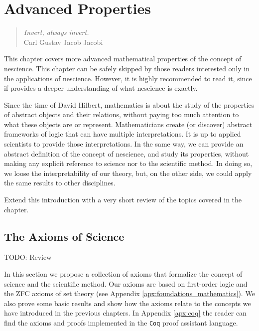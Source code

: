 %
%


\chapter{Advanced Properties}
\label{chap:Properties-Nescience}

\begin{quote}
\begin{flushright}
\emph{Invert, always invert.}\\
Carl Gustav Jacob Jacobi\\
\end{flushright}
\end{quote}
\bigskip

This chapter covers more advanced mathematical properties of the concept of nescience. This chapter can be safely skipped by those readers interested only in the applications of nescience. However, it is highly recommended to read it, since if provides a deeper understanding of what nescience is exactly.

Since the time of David Hilbert, mathematics is about the study of the properties of abstract objects and their relations, without paying too much attention to what these objects are or represent. Mathematicians create (or discover) abstract frameworks of logic that can have multiple interpretations. It is up to applied scientists to provide those interpretations. In the same way, we can provide an abstract definition of the concept of nescience, and study its properties, without making any explicit reference to science nor to the scientific method. In doing so, we loose the interpretability of our theory, but, on the other side, we could apply the same results to other disciplines.

{\color{red} Extend this introduction with a very short review of the topics covered in the chapter.}

%
%

\section{The Axioms of Science}

{\color{red} TODO: Review}

In this section we propose a collection of axioms that formalize the concept of science and the scientific method. Our axioms are based on first-order logic and the ZFC axioms of set theory (see Appendix \ref{apx:foundations_mathematics}). We also prove some basic results and show how the axioms relate to the concepts we have introduced in the previous chapters. In Appendix \ref{apx:coq} the reader can find the axioms and proofs implemented in the \texttt{Coq} proof assistant language.


